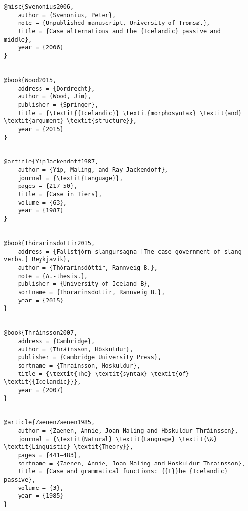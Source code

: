 \begin{verbatim}
@misc{Svenonius2006,
	author = {Svenonius, Peter},
	note = {Unpublished manuscript, University of Tromsø.},
	title = {Case alternations and the {Icelandic} passive and middle},
	year = {2006}
}


@book{Wood2015,
	address = {Dordrecht},
	author = {Wood, Jim},
	publisher = {Springer},
	title = {\textit{{Icelandic}} \textit{morphosyntax} \textit{and} \textit{argument} \textit{structure}},
	year = {2015}
}


@article{YipJackendoff1987,
	author = {Yip, Maling, and Ray Jackendoff},
	journal = {\textit{Language}},
	pages = {217–50},
	title = {Case in Tiers},
	volume = {63},
	year = {1987}
}


@book{Thórarinsdóttir2015,
	address = {Fallstjórn slangursagna [The case government of slang verbs.] Reykjavík},
	author = {Thórarinsdóttir, Rannveig B.},
	note = {A.-thesis.},
	publisher = {University of Iceland B},
	sortname = {Thorarinsdottir, Rannveig B.},
	year = {2015}
}


@book{Thráinsson2007,
	address = {Cambridge},
	author = {Thráinsson, Höskuldur},
	publisher = {Cambridge University Press},
	sortname = {Thrainsson, Hoskuldur},
	title = {\textit{The} \textit{syntax} \textit{of} \textit{{Icelandic}}},
	year = {2007}
}


@article{ZaenenZaenen1985,
	author = {Zaenen, Annie, Joan Maling and Höskuldur Thráinsson},
	journal = {\textit{Natural} \textit{Language} \textit{\&} \textit{Linguistic} \textit{Theory}},
	pages = {441–483},
	sortname = {Zaenen, Annie, Joan Maling and Hoskuldur Thrainsson},
	title = {Case and grammatical functions: {{T}}he {Icelandic} passive},
	volume = {3},
	year = {1985}
}


\end{verbatim}